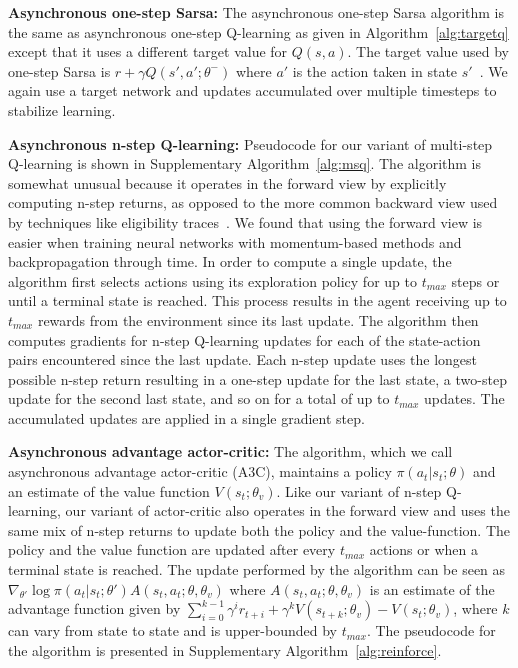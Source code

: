 \documentclass{article} \usepackage{times}
\begin{document}
\textbf{Asynchronous one-step Sarsa:}
The asynchronous one-step Sarsa algorithm is the same as asynchronous one-step Q-learning as given in Algorithm~\ref{alg:targetq} except that it uses a different target value for $Q(s,a)$.
The target value used by one-step Sarsa is $r + \gamma Q(s', a'; \theta^-)$ where $a'$ is the action taken in state $s'$~\citep{rummery1994sarsa,sutton:book}.
We again use a target network and updates accumulated over multiple timesteps to stabilize learning.





\textbf{Asynchronous n-step Q-learning:}
Pseudocode for our variant of multi-step Q-learning is shown in Supplementary Algorithm~\ref{alg:msq}.
The algorithm is somewhat unusual because it operates in the forward view by explicitly computing n-step returns, as opposed to the more common backward view used by techniques like eligibility traces~\citep{sutton:book}.
We found that using the forward view is easier when training neural networks with momentum-based methods and backpropagation through time.
In order to compute a single update, the algorithm first selects actions using its exploration policy for up to $t_{max}$ steps or until a terminal state is reached.
This process results in the agent receiving up to $t_{max}$ rewards from the environment since its last update.
The algorithm then computes gradients for n-step Q-learning updates for each of the state-action pairs encountered since the last update.
Each n-step update uses the longest possible n-step return resulting in a one-step update for the last state, a two-step update for the second last state, and so on for a total of up to $t_{max}$ updates.
The accumulated updates are applied in a single gradient step.





\textbf{Asynchronous advantage actor-critic:}
The algorithm, which we call asynchronous advantage actor-critic (A3C), maintains a policy $\pi(a_t|s_t;\theta)$ and an estimate of the value function $V(s_t;\theta_v)$.
Like our variant of n-step Q-learning, our variant of actor-critic also operates in the forward view and uses the same mix of n-step returns to update both the policy and the value-function.
The policy and the value function are updated after every $t_{max}$ actions or when a terminal state is reached.
The update performed by the algorithm can be seen as $\nabla_{\theta'} \log\pi(a_t|s_t;\theta') A(s_t,a_t;\theta,\theta_v)$ where $A(s_t,a_t;\theta,\theta_v)$ is an estimate of the advantage function given by $\sum_{i=0}^{k-1}\gamma^i r_{t+i} + \gamma^k V(s_{t+k};\theta_v)-V(s_t;\theta_v)$, where $k$ can vary from state to state and is upper-bounded by $t_{max}$.
The pseudocode for the algorithm is presented in Supplementary Algorithm~\ref{alg:reinforce}.
\end{document}
